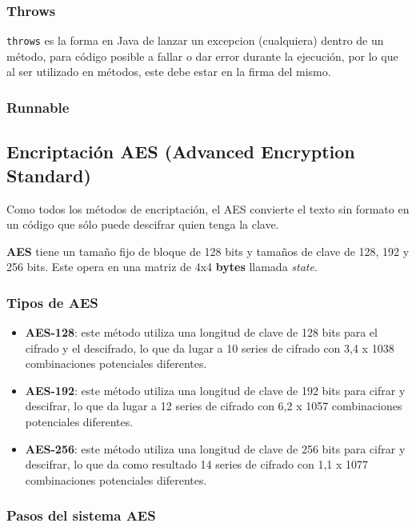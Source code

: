\documentclass[a4paper, 12pt]{article}
\newcommand{\code}[1]{\colorbox{light-gray}{\texttt{#1}}}
\begin{document}
\subsubsection*{Throws}
\code{throws} es la forma en Java de lanzar un excepcion (cualquiera) dentro de un método, para código posible a fallar
o dar error durante la ejecución, por lo que al ser utilizado en métodos, este debe estar en la firma del mismo.

\subsubsection*{Runnable}

\subsection*{Encriptación AES (Advanced Encryption
Standard)}\label{aes}

Como todos los métodos de encriptación, el AES convierte el texto sin
formato en un código que sólo puede descifrar quien tenga la clave.

\textbf{AES} tiene un tamaño fijo de bloque de 128 bits y tamaños de
clave de 128, 192 y 256 bits. Este opera en una matriz de 4x4
\textbf{bytes} llamada \emph{state}.

\subsubsection*{Tipos de AES}\label{tipos-de-aes}

\begin{itemize}
\item
  \textbf{AES-128}: este método utiliza una longitud de clave de 128 bits para el
  cifrado y el descifrado, lo que da lugar a 10 series de cifrado con
  3,4 x 1038 combinaciones potenciales diferentes.
\item
  \textbf{AES-192}: este método utiliza una longitud de clave de 192 bits para
  cifrar y descifrar, lo que da lugar a 12 series de cifrado con 6,2 x
  1057 combinaciones potenciales diferentes.
\item
  \textbf{AES-256}: este método utiliza una longitud de clave de 256 bits para
  cifrar y descifrar, lo que da como resultado 14 series de cifrado con
  1,1 x 1077 combinaciones potenciales diferentes.
\end{itemize}

\subsubsection*{Pasos del sistema AES}\label{pasos-del-sistema-aes}
\end{document}
